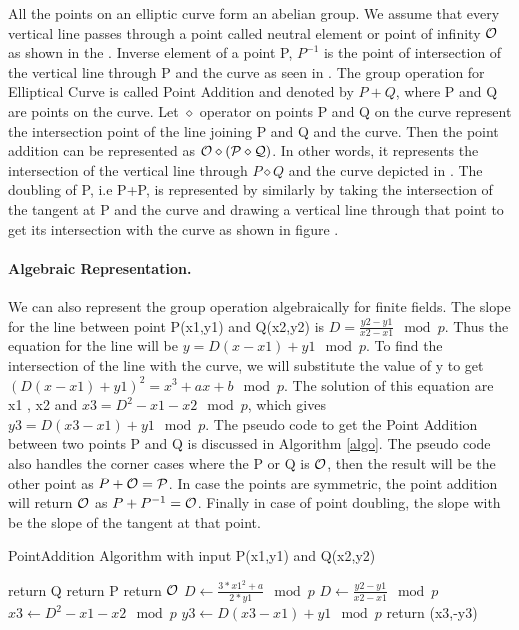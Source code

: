 All the points on an elliptic curve form an abelian group. We assume that every vertical line passes through a point called neutral element or point of infinity $ \cal O$ as shown in the . Inverse element of a point P, $P^{-1}$ is the point of intersection of the vertical line through P and the curve as seen in . The group operation for Elliptical Curve is called Point Addition and denoted by $P+Q$, where P and Q are points on the curve. Let $\diamond$ operator on points P and Q on the curve represent the intersection point of the line joining P and Q and the curve. Then the point addition can be represented as $\cal O \diamond (P \diamond Q)$. In other words, it represents the intersection of the vertical line through $P \diamond Q$ and the curve depicted in . The doubling of P, i.e P+P, is represented by similarly by taking the intersection of the tangent at P and the curve and drawing a vertical line through that point to get its intersection with the curve as shown in figure .

\paragraph{Algebraic Representation.} We can also represent the group operation algebraically for finite fields. The slope for the line between point P(x1,y1) and Q(x2,y2) is $D = \frac{y2-y1}{x2-x1} \mod p$. Thus the equation for the line will be  $y = D(x-x1) + y1 \mod p$. To find the intersection of the line with the curve, we will substitute the value of y to get ${(D(x-x1) + y1)}^2 = x^3 + ax + b \mod p$. The solution of this equation are x1 , x2 and $x3 = D^2-x1-x2 \mod p$, which gives $y3 = D(x3-x1) + y1 \mod p$. The pseudo code to get the Point Addition between two points P and Q is discussed in Algorithm \ref{algo}. The pseudo code also handles the corner cases where the P or Q is $\cal O$, then the result will be the other point as $P+\cal O = P$. In case the points are symmetric, the point addition will return $\cal O$ as $P + P^{-1}=\cal O $. Finally in case of point doubling, the slope with be the slope of the tangent at that point.

\makeatletter
\def\BState{\State\hskip-\ALG@thistlm}
\makeatother

\begin{algorithm}
\caption{PointAddition Algorithm with input P(x1,y1) and Q(x2,y2) }\label{algo}
\begin{algorithmic}[1]
return Q
\EndIf
{}
return P
\EndIf
{}
return $\cal O$
\EndIf
{}
\State $D \gets \frac{3*{x1}^2+a}{2*y1} \mod p$
\Else 
\State $D \gets \frac{y2-y1}{x2-x1} \mod p$
\EndIf
\State $x3 \gets D^2-x1-x2 \mod p$
\State $y3 \gets D(x3-x1) + y1 \mod p$
\State return (x3,-y3)
\EndProcedure
\end{algorithmic}
\end{algorithm}

